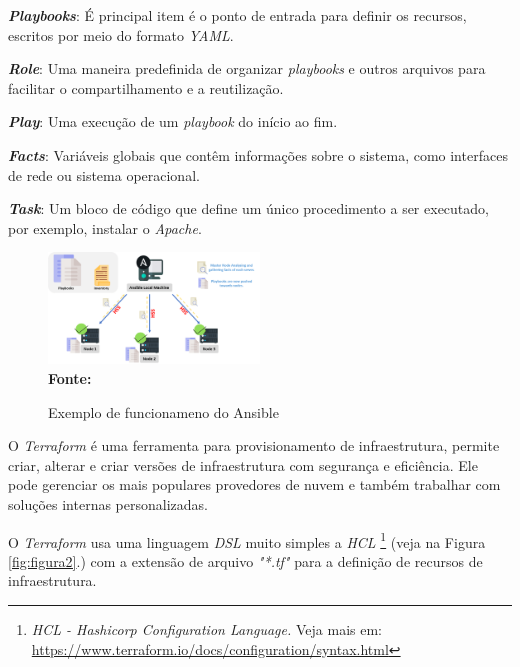 \textbf{\textit{Playbooks}}: É principal item é o ponto de entrada para definir os recursos, escritos por meio do formato \textit{YAML}.

\textbf{\textit{Role}}: Uma maneira predefinida de organizar \textit{playbooks} e outros arquivos para facilitar o compartilhamento e a reutilização.

\textbf{\textit{Play}}: Uma execução de um \textit{playbook} do início ao fim.

\textbf{\textit{Facts}}: Variáveis globais que contêm informações sobre o sistema, como interfaces de rede ou sistema operacional.

\textbf{\textit{Task}}: Um bloco de código que define um único procedimento a ser executado, por exemplo, instalar o \textit{Apache}.

 \begin{figure}[ht]
	\centering	
	\caption[\hspace{0.1cm}Exemplo de funcionameno do Ansible]{Exemplo de funcionameno do Ansible}
	\vspace{-0.4cm}
	\includegraphics[width=0.5\textwidth]{figuras/ansible-working.png}
	 \vspace{-0.2cm}
	\\\textbf{\footnotesize Fonte: \cite{intellipaat}}
	\label{fig:figura6}
\end{figure}
\vspace{-0.5cm}


 O \textit{Terraform} é uma ferramenta para provisionamento de infraestrutura, permite criar, alterar e criar versões de infraestrutura com segurança e eficiência. Ele pode gerenciar os mais populares provedores de nuvem e também trabalhar com soluções internas personalizadas.

O \textit{Terraform} usa uma linguagem \textit{DSL} muito simples a \textit{HCL} \footnote{\textit{HCL - Hashicorp Configuration Language.} Veja mais em: \href{https://www.terraform.io/docs/configuration/syntax.html}{https://www.terraform.io/docs/configuration/syntax.html} } (veja na Figura \ref{fig:figura2}.) com a extensão de arquivo \textit{"*.tf"} para a definição de recursos de infraestrutura. 

